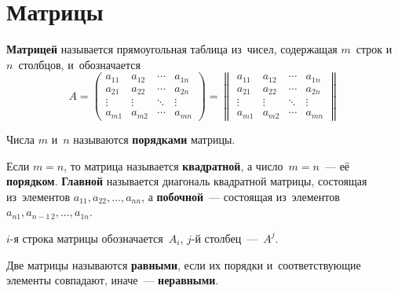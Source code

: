 \section{Матрицы}
\textbf{Матрицей} называется прямоугольная таблица из~чисел, содержащая $m$~строк и~$n$~столбцов, и~обозначается
\begin{equation*}
A =
\begin{pmatrix}
a_{11} & a_{12} & \cdots & a_{1n} \\
a_{21} & a_{22} & \cdots & a_{2n} \\
\vdots & \vdots & \ddots & \vdots \\
a_{m1} & a_{m2} & \cdots & a_{mn}
\end{pmatrix} =
\begin{Vmatrix}
a_{11} & a_{12} & \cdots & a_{1n} \\
a_{21} & a_{22} & \cdots & a_{2n} \\
\vdots & \vdots & \ddots & \vdots \\
a_{m1} & a_{m2} & \cdots & a_{mn}
\end{Vmatrix}
\end{equation*}

Числа $m$ и~$n$ называются \textbf{порядками} матрицы.

Если $m = n$, то матрица называется \textbf{квадратной}, а число~$m = n$~--- её \textbf{порядком}.
\textbf{Главной} называется диагональ квадратной матрицы, состоящая из~элементов $a_{11}, a_{22}, \ldots, a_{nn}$, а \textbf{побочной}~--- состоящая из~элементов $a_{n1}, a_{n-1\, 2}, \ldots, a_{1n}$.

$i$\nobreakdash-я строка матрицы обозначается~$A_i$, $j$\nobreakdash-й столбец~---~$A^j$.

Две матрицы называются \textbf{равными}, если их порядки и~соответствующие элементы совпадают, иначе~--- \textbf{неравными}.






